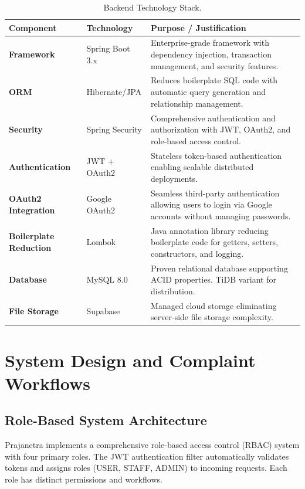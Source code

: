 \documentclass[12pt,a4paper]{report}
\begin{document}
\begin{table}[H]
\centering
\caption{Backend Technology Stack.}
\label{tab:backend_stack}
\small
\begin{tabular}{>{\raggedright\arraybackslash}p{3cm} >{\raggedright\arraybackslash}p{3.5cm} >{\raggedright\arraybackslash}p{7.5cm}}
\toprule
\textbf{Component} & \textbf{Technology} & \textbf{Purpose / Justification} \\
\midrule
\textbf{Framework} & Spring Boot 3.x & Enterprise-grade framework with dependency injection, transaction management, and security features. \\
\midrule
\textbf{ORM} & Hibernate/JPA & Reduces boilerplate SQL code with automatic query generation and relationship management. \\
\midrule
\textbf{Security} & Spring Security & Comprehensive authentication and authorization with JWT, OAuth2, and role-based access control. \\
\midrule
\textbf{Authentication} & JWT + OAuth2 & Stateless token-based authentication enabling scalable distributed deployments. \\
\midrule
\textbf{OAuth2 Integration} & Google OAuth2 & Seamless third-party authentication allowing users to login via Google accounts without managing passwords. \\
\midrule
\textbf{Boilerplate Reduction} & Lombok & Java annotation library reducing boilerplate code for getters, setters, constructors, and logging. \\
\midrule
\textbf{Database} & MySQL 8.0 & Proven relational database supporting ACID properties. TiDB variant for distribution. \\
\midrule
\textbf{File Storage} & Supabase & Managed cloud storage eliminating server-side file storage complexity. \\
\bottomrule
\end{tabular}
\end{table}

\chapter{System Design and Complaint Workflows}

\section{Role-Based System Architecture}
Prajanetra implements a comprehensive role-based access control (RBAC) system with four primary roles. The JWT authentication filter automatically validates tokens and assigns roles (USER, STAFF, ADMIN) to incoming requests. Each role has distinct permissions and workflows.
\end{document}
